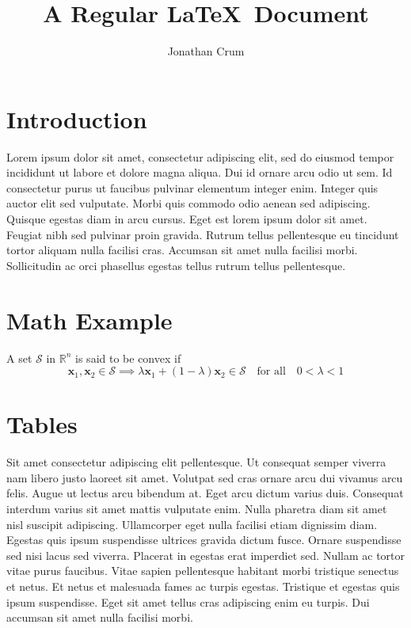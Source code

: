 \documentclass{article}
\title{A Regular \LaTeX\ Document}
\author{Jonathan Crum}
\date{}
\begin{document}
\maketitle

\section{Introduction}

Lorem ipsum dolor sit amet, consectetur adipiscing elit, sed do eiusmod tempor incididunt ut labore et dolore magna aliqua. Dui id ornare arcu odio ut sem. Id consectetur purus ut faucibus pulvinar elementum integer enim. Integer quis auctor elit sed vulputate. Morbi quis commodo odio aenean sed adipiscing. Quisque egestas diam in arcu cursus. Eget est lorem ipsum dolor sit amet. Feugiat nibh sed pulvinar proin gravida. Rutrum tellus pellentesque eu tincidunt tortor aliquam nulla facilisi cras. Accumsan sit amet nulla facilisi morbi. Sollicitudin ac orci phasellus egestas tellus rutrum tellus pellentesque.

\section{Math Example}
A set \( \mathcal{S} \) in \( \mathbb{R}^n \) is said to be convex if
\[ \mathbf{x}_1, \mathbf{x}_2 \in \mathcal{S} \implies \lambda \mathbf{x}_1 +
(1-\lambda) \mathbf{x}_2 \in \mathcal{S} \text{~~~for all~~~} 0 < \lambda < 1 \]

\section{Tables}
\vspace{1cm}
Sit amet consectetur adipiscing elit pellentesque. Ut consequat semper viverra nam libero justo laoreet sit amet. Volutpat sed cras ornare arcu dui vivamus arcu felis. Augue ut lectus arcu bibendum at. Eget arcu dictum varius duis. Consequat interdum varius sit amet mattis vulputate enim. Nulla pharetra diam sit amet nisl suscipit adipiscing. Ullamcorper eget nulla facilisi etiam dignissim diam. Egestas quis ipsum suspendisse ultrices gravida dictum fusce. Ornare suspendisse sed nisi lacus sed viverra. Placerat in egestas erat imperdiet sed. Nullam ac tortor vitae purus faucibus. Vitae sapien pellentesque habitant morbi tristique senectus et netus. Et netus et malesuada fames ac turpis egestas. Tristique et egestas quis ipsum suspendisse. Eget sit amet tellus cras adipiscing enim eu turpis. Dui accumsan sit amet nulla facilisi morbi.
\end{document}
